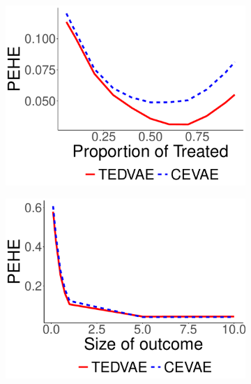 \documentclass[letterpaper]{article} %
\begin{document}
\begin{figure}[!t]
\begin{subfigure}{0.15\textwidth}
\end{subfigure}
\\
\begin{subfigure}{0.15\textwidth}
\includegraphics[width=\linewidth]{synthetic1_alpha.pdf}
\end{subfigure}
\begin{subfigure}{0.15\textwidth}
\includegraphics[width=\linewidth]{synthetic1_beta.pdf}
\end{subfigure}
\begin{subfigure}{0.15\textwidth}

\end{subfigure}
\end{figure}
\end{document}
